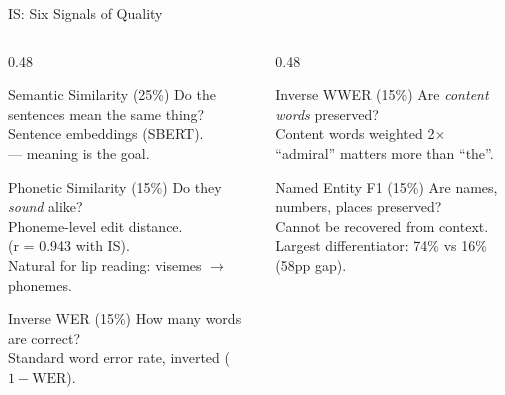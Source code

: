 \begin{frame}[shrink=5]{IS: Six Signals of Quality}
  \begin{columns}[T]
    \begin{column}{0.48\textwidth}
      \begin{block}{\small Semantic Similarity (25\%)}
        {\scriptsize Do the sentences mean the same thing?\\
        Sentence embeddings (SBERT).\\[2pt]
         --- meaning is the goal.}
      \end{block}

      \vspace{2pt}

      \begin{block}{\small Phonetic Similarity (15\%)}
        {\scriptsize Do they \textit{sound} alike?\\
        Phoneme-level edit distance.\\[2pt]
         (r = 0.943 with IS).\\
        Natural for lip reading: visemes $\rightarrow$ phonemes.}
      \end{block}

      \vspace{2pt}

      \begin{block}{\small Inverse WER (15\%)}
        {\scriptsize How many words are correct?\\
        Standard word error rate, inverted ($1 - \text{WER}$).}
      \end{block}
    \end{column}
    \begin{column}{0.48\textwidth}
      \begin{block}{\small Inverse WWER (15\%)}
        {\scriptsize Are \textit{content words} preserved?\\
        Content words weighted 2$\times$\\[2pt]
        ``admiral'' matters more than ``the''.}
      \end{block}

      \vspace{2pt}

      \begin{block}{\small Named Entity F1 (15\%)}
        {\scriptsize Are names, numbers, places preserved?\\
        \alert{Cannot be recovered from context}.\\[2pt]
        Largest differentiator: 74\% vs 16\% (58pp gap).}
      \end{block}


\end{column}
\end{columns}
\end{frame}
